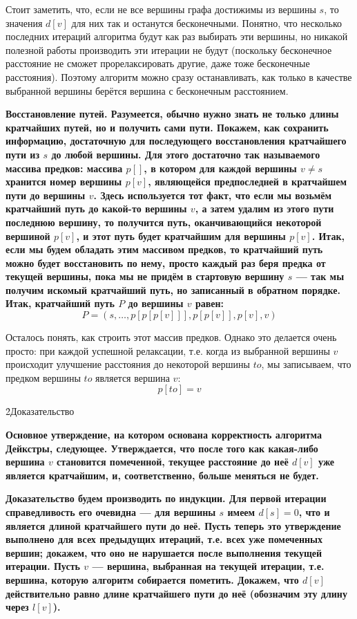 Стоит заметить, что, если не все вершины графа достижимы из вершины $s$, то значения $d[v]$ для них так и останутся бесконечными. Понятно, что несколько последних итераций алгоритма будут как раз выбирать эти вершины, но никакой полезной работы производить эти итерации не будут (поскольку бесконечное расстояние не сможет прорелаксировать другие, даже тоже бесконечные расстояния). Поэтому алгоритм можно сразу останавливать, как только в качестве выбранной вершины берётся вершина с бесконечным расстоянием.

\bf{Восстановление путей}. Разумеется, обычно нужно знать не только длины кратчайших путей, но и получить сами пути. Покажем, как сохранить информацию, достаточную для последующего восстановления кратчайшего пути из $s$ до любой вершины. Для этого достаточно так называемого \bf{массива предков}: массива $p[]$, в котором для каждой вершины $v \ne s$ хранится номер вершины $p[v]$, являющейся предпоследней в кратчайшем пути до вершины $v$. Здесь используется тот факт, что если мы возьмём кратчайший путь до какой-то вершины $v$, а затем удалим из этого пути последнюю вершину, то получится путь, оканчивающийся некоторой вершиной $p[v]$, и этот путь будет кратчайшим для вершины $p[v]$. Итак, если мы будем обладать этим массивом предков, то кратчайший путь можно будет восстановить по нему, просто каждый раз беря предка от текущей вершины, пока мы не придём в стартовую вершину $s$ --- так мы получим искомый кратчайший путь, но записанный в обратном порядке. Итак, кратчайший путь $P$ до вершины $v$ равен:
$$ P = (s, \ldots, p[p[p[v]]], p[p[v]], p[v], v) $$

Осталось понять, как строить этот массив предков. Однако это делается очень просто: при каждой успешной релаксации, т.е. когда из выбранной вершины $v$ происходит улучшение расстояния до некоторой вершины $to$, мы записываем, что предком вершины $to$ является вершина $v$:
$$ p[to] = v $$

\h2{Доказательство}

\bf{Основное утверждение}, на котором основана корректность алгоритма Дейкстры, следующее. Утверждается, что после того как какая-либо вершина $v$ становится помеченной, текущее расстояние до неё $d[v]$ уже является кратчайшим, и, соответственно, больше меняться не будет.

\bf{Доказательство} будем производить по индукции. Для первой итерации справедливость его очевидна --- для вершины $s$ имеем $d[s]=0$, что и является длиной кратчайшего пути до неё. Пусть теперь это утверждение выполнено для всех предыдущих итераций, т.е. всех уже помеченных вершин; докажем, что оно не нарушается после выполнения текущей итерации. Пусть $v$ --- вершина, выбранная на текущей итерации, т.е. вершина, которую алгоритм собирается пометить. Докажем, что $d[v]$ действительно равно длине кратчайшего пути до неё (обозначим эту длину через $l[v]$).

